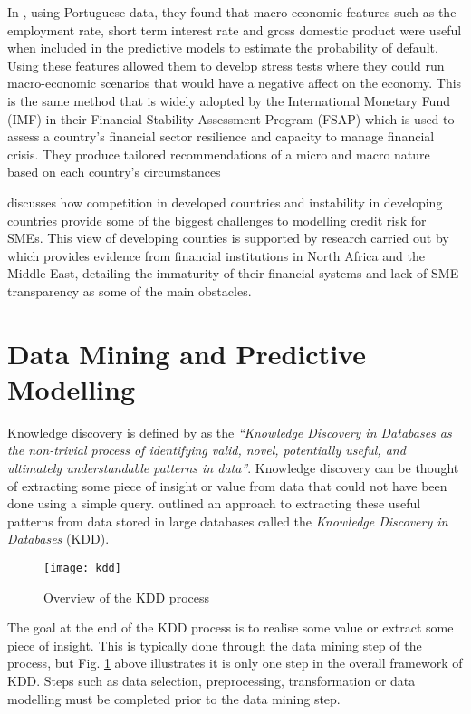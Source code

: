 In \cite{antunes_estimating_2005}, using Portuguese data, they found that macro-economic features such as the employment rate, short term interest rate and gross domestic product were useful when included in the predictive models to estimate the probability of default. Using these features allowed them to develop stress tests where they could run macro-economic scenarios that would have a negative affect on the economy. This is the same method that is widely adopted by the International Monetary Fund (IMF) in their Financial Stability Assessment Program (FSAP) which is used to assess a country's financial sector resilience and capacity to manage financial crisis. They produce tailored recommendations of a micro and macro nature based on each country's circumstances \citep{marston_financial_2001} 

\cite{ardic_small_2011} discusses how competition in developed countries and instability in developing countries provide some of the biggest challenges to modelling credit risk for SMEs. This view of developing counties is supported by research carried out by \cite{rocha_status_2011} which provides evidence from financial institutions in North Africa and the Middle East, detailing the immaturity of their financial systems and lack of SME transparency as some of the main obstacles. 


\section{Data Mining and Predictive Modelling}\label{sec:dataMining}
Knowledge discovery is defined by \cite{frawley_knowledge_1992} as the \textit{``Knowledge Discovery in Databases as the non-trivial process of identifying valid, novel, potentially useful, and ultimately understandable patterns in data''}. Knowledge discovery can be thought of extracting some piece of insight or value from data that could not have been done using a simple query. \cite{fayyad_knowledge_1996} outlined an approach to extracting these useful patterns from data stored in large databases called the \textit{Knowledge Discovery in Databases} (KDD).

\begin{figure}[H]
	\texttt{[image: kdd]}
	\caption{Overview of the KDD process  \\
		\cite[Source:][]{fayyad_knowledge_1996}		
	}
	\label{fig:kdd}
\end{figure}

The goal at the end of the KDD process is to realise some value or extract some piece of insight. This is typically done through the data mining step of the process, but Fig. \ref{fig:kdd} above illustrates it is only one step in the overall framework of KDD. Steps such as data selection, preprocessing, transformation or data modelling must be completed prior to the data mining step. 


